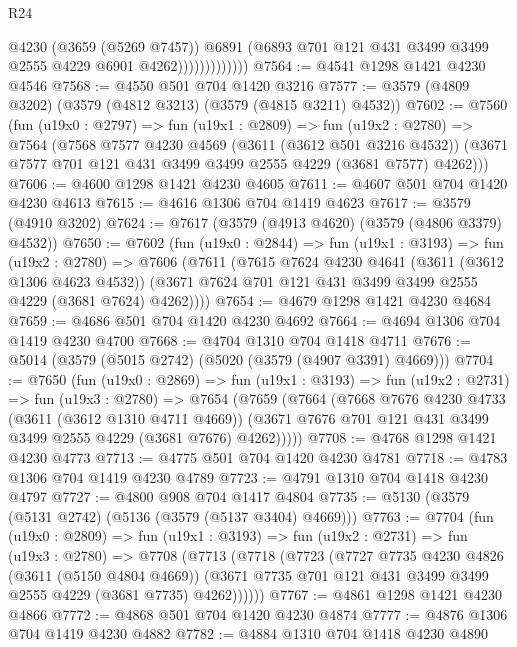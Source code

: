 \begin{lexlean}{R24}
\begin{coremodule}
                            @4230
                            (@3659 (@5269 @7457))
                            @6891
                            (@6893 @701 @121 @431 @3499 @3499 @2555 @4229 @6901 @4262)))))))))))))
@7564 := @4541 @1298 @1421 @4230 @4546
@7568 := @4550 @501 @704 @1420 @3216
@7577 := @3579 (@4809 @3202) (@3579 (@4812 @3213) (@3579 (@4815 @3211) @4532))
@7602 := @7560
    (fun (u19x0 : @2797) =>
    fun (u19x1 : @2809) =>
    fun (u19x2 : @2780) =>
    @7564
      (@7568
        @7577
        @4230
        @4569
        (@3611 (@3612 @501 @3216 @4532))
        (@3671 @7577 @701 @121 @431 @3499 @3499 @2555 @4229 (@3681 @7577) @4262)))
@7606 := @4600 @1298 @1421 @4230 @4605
@7611 := @4607 @501 @704 @1420 @4230 @4613
@7615 := @4616 @1306 @704 @1419 @4623
@7617 := @3579 (@4910 @3202)
@7624 := @7617 (@3579 (@4913 @4620) (@3579 (@4806 @3379) @4532))
@7650 := @7602
    (fun (u19x0 : @2844) =>
    fun (u19x1 : @3193) =>
    fun (u19x2 : @2780) =>
    @7606
      (@7611
        (@7615
          @7624
          @4230
          @4641
          (@3611 (@3612 @1306 @4623 @4532))
          (@3671 @7624 @701 @121 @431 @3499 @3499 @2555 @4229 (@3681 @7624) @4262))))
@7654 := @4679 @1298 @1421 @4230 @4684
@7659 := @4686 @501 @704 @1420 @4230 @4692
@7664 := @4694 @1306 @704 @1419 @4230 @4700
@7668 := @4704 @1310 @704 @1418 @4711
@7676 := @5014 (@3579 (@5015 @2742) (@5020 (@3579 (@4907 @3391) @4669)))
@7704 := @7650
    (fun (u19x0 : @2869) =>
    fun (u19x1 : @3193) =>
    fun (u19x2 : @2731) =>
    fun (u19x3 : @2780) =>
    @7654
      (@7659
        (@7664
          (@7668
            @7676
            @4230
            @4733
            (@3611 (@3612 @1310 @4711 @4669))
            (@3671 @7676 @701 @121 @431 @3499 @3499 @2555 @4229 (@3681 @7676) @4262)))))
@7708 := @4768 @1298 @1421 @4230 @4773
@7713 := @4775 @501 @704 @1420 @4230 @4781
@7718 := @4783 @1306 @704 @1419 @4230 @4789
@7723 := @4791 @1310 @704 @1418 @4230 @4797
@7727 := @4800 @908 @704 @1417 @4804
@7735 := @5130 (@3579 (@5131 @2742) (@5136 (@3579 (@5137 @3404) @4669)))
@7763 := @7704
    (fun (u19x0 : @2809) =>
    fun (u19x1 : @3193) =>
    fun (u19x2 : @2731) =>
    fun (u19x3 : @2780) =>
    @7708
      (@7713
        (@7718
          (@7723
            (@7727
              @7735
              @4230
              @4826
              (@3611 (@5150 @4804 @4669))
              (@3671 @7735 @701 @121 @431 @3499 @3499 @2555 @4229 (@3681 @7735) @4262))))))
@7767 := @4861 @1298 @1421 @4230 @4866
@7772 := @4868 @501 @704 @1420 @4230 @4874
@7777 := @4876 @1306 @704 @1419 @4230 @4882
@7782 := @4884 @1310 @704 @1418 @4230 @4890

\end{coremodule}
\end{lexlean}
